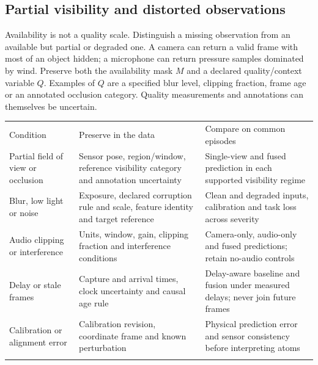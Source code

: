 \documentclass[11pt,a4paper]{article}
\newcounter{none}
\begin{document}
\par{}

\subsection{Partial visibility and distorted observations}\label{partial-visibility-and-distorted-observations}

Availability is not a quality scale. Distinguish a missing observation from an available but partial or degraded one. A camera can return a valid frame with most of an object hidden; a microphone can return pressure samples dominated by wind. Preserve both the availability mask \(M\) and a declared quality/context variable \(Q\). Examples of \(Q\) are a specified blur level, clipping fraction, frame age or an annotated occlusion category. Quality measurements and annotations can themselves be uncertain.

{\def\LTcaptype{none} %
\begin{longtable}[]{@{}
  >{\raggedright\arraybackslash}p{}
  >{\raggedright\arraybackslash}p{}
  >{\raggedright\arraybackslash}p{}@{}}
\toprule\noalign{}
\begin{minipage}[b]{\linewidth}\raggedright
Condition
\end{minipage} & \begin{minipage}[b]{\linewidth}\raggedright
Preserve in the data
\end{minipage} & \begin{minipage}[b]{\linewidth}\raggedright
Compare on common episodes
\end{minipage} \\*
\midrule\noalign{}
\endhead
\bottomrule\noalign{}
\endfoot
Partial field of view or occlusion & Sensor pose, region/window, reference visibility category and annotation uncertainty & Single-view and fused prediction in each supported visibility regime \\*
Blur, low light or noise & Exposure, declared corruption rule and scale, feature identity and target reference & Clean and degraded inputs, calibration and task loss across severity \\*
Audio clipping or interference & Units, window, gain, clipping fraction and interference conditions & Camera-only, audio-only and fused predictions; retain no-audio controls \\*
Delay or stale frames & Capture and arrival times, clock uncertainty and causal age rule & Delay-aware baseline and fusion under measured delays; never join future frames \\*
Calibration or alignment error & Calibration revision, coordinate frame and known perturbation & Physical prediction error and sensor consistency before interpreting atoms \\*
\end{longtable}
}
\end{document}
